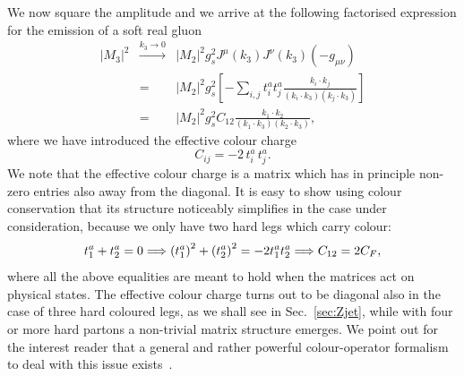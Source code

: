 We now square the amplitude and we arrive at the following factorised
expression for the emission of a soft real gluon
\begin{eqnarray}\label{eq:eikonalfactorisation}
\left|M_3\right|^{2}&\stackrel{k_3\to 0}{\longrightarrow} &\left|M_2\right|^{2}g_s^{2} J^{\mu}\left(k_3\right)J^{\nu}\left(k_3\right)\left(-g_{\mu\nu}\right)\nonumber\\
&=&\left|M_2\right|^{2}g_s^{2} \left[-\sum_{i,j}t_{i}^{a}t_{j}^{a}\frac{k_i\cdot k_j}{(k_i\cdot k_3)(k_j\cdot k_3)}\right]\nonumber\\
&=&\left|M_2\right|^{2}g_s^{2}  C_{12}\frac{k_1\cdot k_2}{(k_1\cdot k_3)(k_2\cdot k_3)},
\end{eqnarray}
where we have introduced the effective colour charge
\begin{equation}\label{eq:eff-col-def}
C_{ij}= - 2 \, t_{i}^{a}\, t_{j}^{a}.
\end{equation}
We note that the effective colour charge is a matrix which has in principle non-zero entries also away from the diagonal. It is easy to show using colour conservation that its structure noticeably simplifies in the case under consideration, because we only have two hard legs which carry colour:
\begin{equation}
t^a_1+t^a_2=0 \Longrightarrow \left({t_1^a}\right)^2+\left({t_2^a}\right)^2= - 2 t_1^a t_2^a  \Longrightarrow C_{12}= 2C_{F},
\end{equation}
where all the above equalities are meant to hold when the matrices act on physical states.
The effective colour charge turns out to be diagonal also in the case of three hard coloured legs, as we shall see in Sec.~\ref{sec:Zjet}, while with four or more hard partons a non-trivial matrix structure emerges.
We point out for the interest reader that a general and rather powerful colour-operator formalism to deal with this issue exists~\cite{Catani:1985xt,Catani:1996vz,Catani:1996jh,Dokshitzer:2005ig,Dokshitzer:2005ek}.


